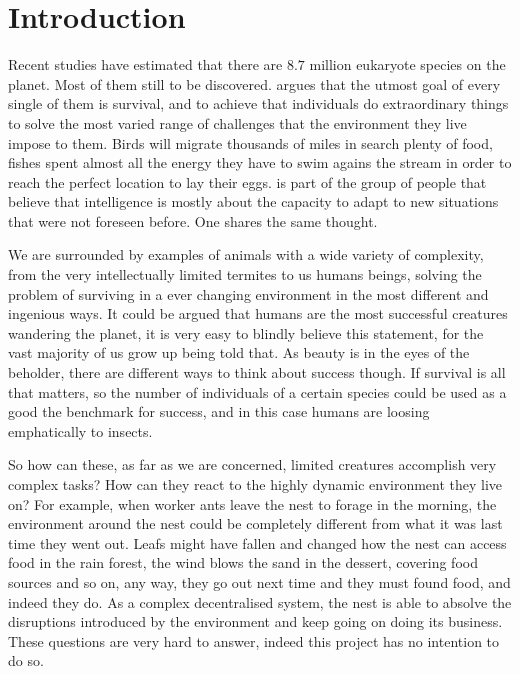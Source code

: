 \chapter{Introduction}
\label{ch:introduction}

Recent studies have estimated that there are $8.7$ million eukaryote species on the planet.\cite{10.1371/journal.pbio.1001127} \cite{10.1371/journal.pbio.1001130} Most of them still to be discovered. \citeauthor{dawkins1990selfish} argues that the utmost goal of every single of them is survival, and to achieve that individuals do extraordinary things to solve the most varied range of challenges that the environment they live impose to them. Birds will migrate thousands of miles in search plenty of food, fishes spent almost all the energy they have to swim agains the stream in order to reach the perfect location to lay their eggs. \citeauthor{kennedy2001swarm} is part of the group of people that believe that intelligence is mostly about the capacity to adapt to new situations that were not foreseen before. \cite{kennedy2001swarm} One shares the same thought.

We are surrounded by examples of animals with a wide variety of complexity, from the very intellectually limited termites to us humans beings, solving the problem of surviving in a ever changing environment in the most different and ingenious ways. It could be argued that humans are the most successful creatures wandering the planet, it is very easy to blindly believe this statement, for the vast majority of us grow up being told that. As beauty is in the eyes of the beholder, there are different ways to think about success though. If survival is all that matters, so the number of individuals of a certain species could be used as a good the benchmark for success, and in this case humans are loosing emphatically to insects. \cite{MAY16091988}

So how can these, as far as we are concerned, limited creatures accomplish very complex tasks? How can they react to the highly dynamic environment they live on? For example, when worker ants leave the nest to forage in the morning, the environment around the nest could be completely different from what it was last time they went out. Leafs might have fallen and changed how the nest can access food in the rain forest, the wind blows the sand in the dessert, covering food sources and so on, any way, they go out next time and they must found food, and indeed they do. As a complex decentralised system, the nest is able to absolve the disruptions introduced by the environment and keep going on doing its business. These questions are very hard to answer, indeed this project has no intention to do so. 
 
